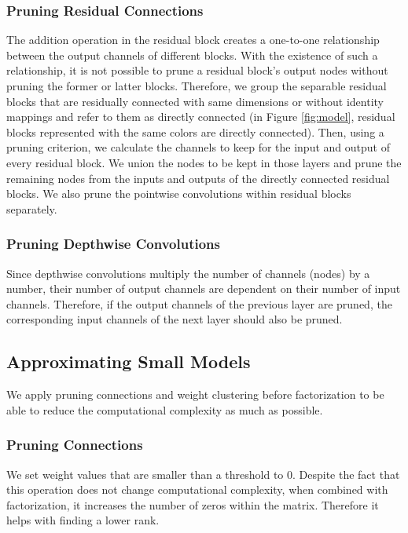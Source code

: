 \subsubsection{Pruning Residual Connections}
The addition operation in the residual block creates a one-to-one relationship between the output channels of different blocks. With the existence of such a relationship, it is not possible to prune a residual block's output nodes without pruning the former or latter blocks. Therefore, we group the separable residual blocks that are residually connected with same dimensions or without identity mappings and refer to them as directly connected (in Figure \ref{fig:model}, residual blocks represented with the same colors are directly connected). Then, using a pruning criterion, we calculate the channels to keep for the input and output of every residual block. We union the nodes to be kept in those layers and prune the remaining nodes from the inputs and outputs of the directly connected residual blocks. We also prune the pointwise convolutions within residual blocks separately.

\subsubsection{Pruning Depthwise Convolutions}
Since depthwise convolutions multiply the number of channels (nodes) by a number, their number of output channels are dependent on their number of input channels. Therefore, if the output channels of the previous layer are pruned, the corresponding input channels of the next layer should also be pruned.

\subsection{Approximating Small Models}
\label{sec:factorization}
We apply pruning connections and weight clustering before factorization to be able to reduce the computational complexity as much as possible.

\subsubsection{Pruning Connections}
We set weight values that are smaller than a threshold to 0. Despite the fact that this operation does not change computational complexity, when combined with factorization, it increases the number of zeros within the matrix. Therefore it helps with finding a lower rank.


